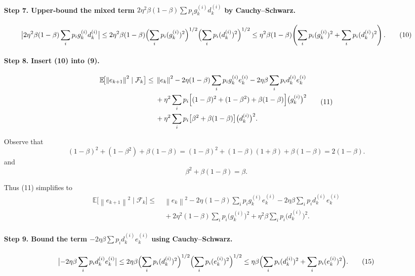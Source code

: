 \documentclass{article}
\newcommand{\E}{\mathbb{E}}
\newcommand{\norm}[1]{\left\|#1\right\|}
\begin{document}
\paragraph{Step 7. Upper‑bound the mixed term $2\eta^{2}\beta(1-\beta)\sum p_i g_k^{(i)}d_k^{(i)}$ by Cauchy–Schwarz.}
\[
\bigl|2\eta^{2}\beta(1-\beta)\sum_{i}p_i g_k^{(i)}d_k^{(i)}\bigr|
\le 2\eta^{2}\beta(1-\beta)\Bigl(\sum_{i}p_i(g_k^{(i)})^{2}\Bigr)^{1/2}
\Bigl(\sum_{i}p_i(d_k^{(i)})^{2}\Bigr)^{1/2}
\le \eta^{2}\beta(1-\beta)\!\left(\sum_{i}p_i(g_k^{(i)})^{2}+\sum_{i}p_i(d_k^{(i)})^{2}\right).
\tag{10}
\]

\paragraph{Step 8. Insert (10) into (9).}
\[
\begin{aligned}
\E\!\bigl[\norm{e_{k+1}}^{2}\mid\mathcal{F}_k\bigr]
\le&\;\norm{e_k}^{2}
-2\eta(1-\beta)\sum_{i}p_i g_k^{(i)}e_k^{(i)}
-2\eta\beta\sum_{i}p_i d_k^{(i)}e_k^{(i)}\\
&\;+\eta^{2}\sum_{i}p_i\Bigl[(1-\beta)^{2}+ (1-\beta^{2})+ \beta(1-\beta)\Bigr]\bigl(g_k^{(i)}\bigr)^{2}\\
&\;+\eta^{2}\sum_{i}p_i\bigl[\beta^{2}+ \beta(1-\beta)\bigr]\bigl(d_k^{(i)}\bigr)^{2}.
\end{aligned}
\tag{11}
\]

Observe that
\[
(1-\beta)^{2}+ (1-\beta^{2})+ \beta(1-\beta)= (1-\beta)^{2}+ (1-\beta)(1+\beta)+\beta(1-\beta)=2(1-\beta).
\tag{12}
\]
and
\[
\beta^{2}+ \beta(1-\beta)=\beta .
\tag{13}
\]

Thus (11) simplifies to
\[
\begin{aligned}
\E\!\bigl[\norm{e_{k+1}}^{2}\mid\mathcal{F}_k\bigr]
\le&\;\norm{e_k}^{2}
-2\eta(1-\beta)\sum_{i}p_i g_k^{(i)}e_k^{(i)}
-2\eta\beta\sum_{i}p_i d_k^{(i)}e_k^{(i)}\\
&\;+2\eta^{2}(1-\beta)\sum_{i}p_i\bigl(g_k^{(i)}\bigr)^{2}
+\eta^{2}\beta\sum_{i}p_i\bigl(d_k^{(i)}\bigr)^{2}.
\end{aligned}
\tag{14}
\]

\paragraph{Step 9. Bound the term $-2\eta\beta\sum p_i d_k^{(i)}e_k^{(i)}$ using Cauchy–Schwarz.}
\[
\bigl|-2\eta\beta\sum_{i}p_i d_k^{(i)}e_k^{(i)}\bigr|
\le 2\eta\beta\Bigl(\sum_{i}p_i(d_k^{(i)})^{2}\Bigr)^{1/2}
\Bigl(\sum_{i}p_i(e_k^{(i)})^{2}\Bigr)^{1/2}
\le \eta\beta\Bigl(\sum_{i}p_i(d_k^{(i)})^{2}+ \sum_{i}p_i(e_k^{(i)})^{2}\Bigr).
\tag{15}
\]
\end{document}
